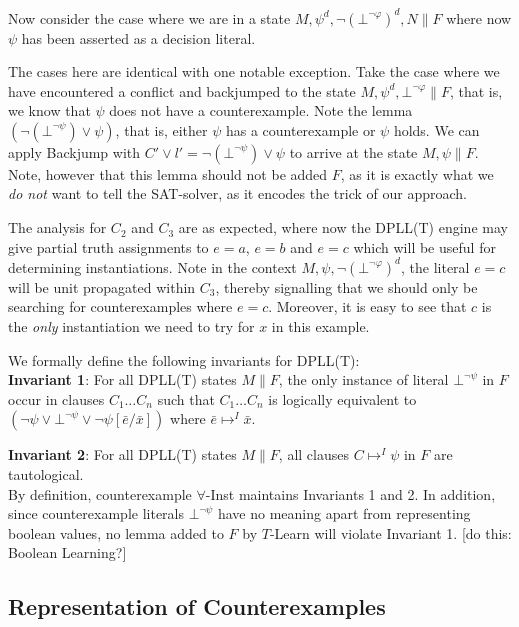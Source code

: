 \documentclass{llncs}
\begin{document}
Now consider the case where we are in a state $M, \psi^d, \neg( \bot^{\neg \varphi} )^d, N  \parallel F$ where now $\psi$ has been asserted as a decision literal.

The cases here are identical with one notable exception.
Take the case where we have encountered a conflict and backjumped to the state $M, \psi^d, \bot^{\neg \varphi} \parallel F$, that is, we know that $\psi$ does not have a counterexample.
Note the lemma $(\neg (\bot^{\neg \psi}) \vee \psi)$, that is, either $\psi$ has a counterexample or $\psi$ holds.
We can apply Backjump with $C' \vee l' = \neg (\bot^{\neg \psi}) \vee \psi$ to arrive at the state $M, \psi \parallel F$.
Note, however that this lemma should not be added $F$, as it is exactly what we \emph{do not} want to tell the SAT-solver, as it encodes the trick of our approach.

The analysis for $C_2$ and $C_3$ are as expected, where now the DPLL(T) engine may give partial truth assignments to $e = a$, $e = b$ and $e = c$ which will be useful for determining instantiations.
Note in the context $M, \psi, \neg( \bot^{\neg \varphi} )^d$, the literal $e = c$ will be unit propagated within $C_3$, thereby signalling that we should only be searching for counterexamples where $e = c$.
Moreover, it is easy to see that $c$ is the \emph{only} instantiation we need to try for $x$ in this example.

We formally define the following invariants for DPLL(T): \\

{\bf Invariant 1}:
For all DPLL(T) states $M \parallel F$, the only instance of literal $\bot^{\neg \psi}$ in $F$ occur in clauses $C_1 \ldots C_n$ such that $C_1 \ldots C_n$ is logically equivalent to $( \neg \psi \vee \bot^{\neg \psi} \vee \neg \psi[\bar{e}/\bar{x}] )$ where $\bar{e} \mapsto^I \bar{x}$.

{\bf Invariant 2}:
For all DPLL(T) states $M \parallel F$, all clauses $C \mapsto^I \psi$ in $F$ are tautological. \\

By definition, counterexample $\forall$-Inst maintains Invariants 1 and 2.
In addition, since counterexample literals $\bot^{ \neg \psi }$ have no meaning apart from representing boolean values, no lemma added to $F$ by $T$-Learn will violate Invariant 1.
[do this: Boolean Learning?]

\subsection{Representation of Counterexamples}
\end{document}
